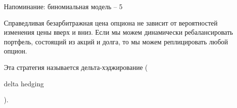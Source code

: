 \documentclass{beamer}
\newcommand{\en}[1]{\begin{otherlanguage}{english}#1\end{otherlanguage}}
\begin{document}
\begin{frame}{Напоминание: биномиальная модель -- 5}
\centering
{}

\justify
Справедливая безарбитражная цена опциона не зависит от вероятностей изменения цены вверх и вниз. Если мы можем \alert{динамически} ребалансировать портфель, состоящий из акций и долга, то мы можем реплицировать любой опцион.

\justify
Эта стратегия называется \alert{дельта-хэджирование} (\en{delta hedging}).
\end{frame}



\newcommand{\highlightStockLink}[6]{
	\draw[
		color=#4,
		very thick,
		->,
		>=triangle 45
	]
	(#1.east) -- (#2.west)
	node[
		pos=#5,
		anchor=#6
	]
	{#3};
}
\end{document}
